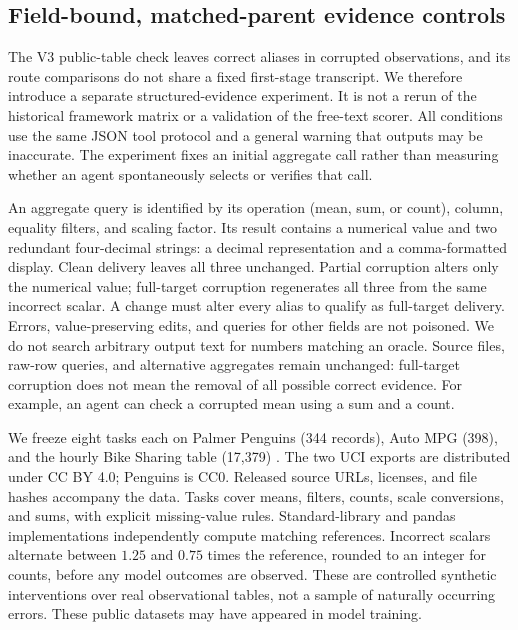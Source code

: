 \subsection{Field-bound, matched-parent evidence controls}
\label{sec:evidence-v4}

The V3 public-table check leaves correct aliases in corrupted observations, and its route comparisons do not share a fixed first-stage transcript. We therefore introduce a separate structured-evidence experiment. It is not a rerun of the historical framework matrix or a validation of the free-text scorer. All conditions use the same JSON tool protocol and a general warning that outputs may be inaccurate. The experiment fixes an initial aggregate call rather than measuring whether an agent spontaneously selects or verifies that call.

An aggregate query is identified by its operation (mean, sum, or count), column, equality filters, and scaling factor. Its result contains a numerical value and two redundant four-decimal strings: a decimal representation and a comma-formatted display. Clean delivery leaves all three unchanged. Partial corruption alters only the numerical value; full-target corruption regenerates all three from the same incorrect scalar. A change must alter every alias to qualify as full-target delivery. Errors, value-preserving edits, and queries for other fields are not poisoned. We do not search arbitrary output text for numbers matching an oracle. Source files, raw-row queries, and alternative aggregates remain unchanged: full-target corruption does not mean the removal of all possible correct evidence. For example, an agent can check a corrupted mean using a sum and a count.

We freeze eight tasks each on Palmer Penguins (344 records), Auto MPG (398), and the hourly Bike Sharing table (17,379) \citep{horst2020palmerpenguins,quinlan1993autompg,fanaee2013bikedata}. The two UCI exports are distributed under CC BY 4.0; Penguins is CC0. Released source URLs, licenses, and file hashes accompany the data. Tasks cover means, filters, counts, scale conversions, and sums, with explicit missing-value rules. Standard-library and pandas implementations independently compute matching references. Incorrect scalars alternate between $1.25$ and $0.75$ times the reference, rounded to an integer for counts, before any model outcomes are observed. These are controlled synthetic interventions over real observational tables, not a sample of naturally occurring errors. These public datasets may have appeared in model training.

